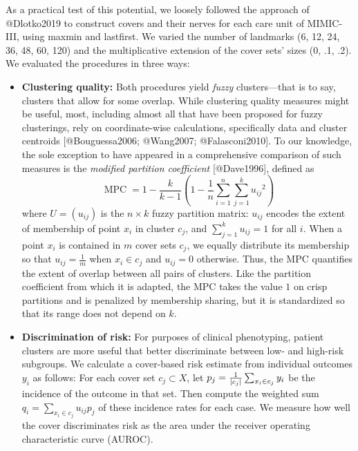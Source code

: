 \documentclass[
]{article}
\providecommand{\tightlist}{%
  \setlength{\itemsep}{0pt}\setlength{\parskip}{0pt}}
\begin{document}
As a practical test of this potential, we loosely followed the approach
of @Dlotko2019 to construct covers and their nerves for each care unit
of MIMIC-III, using maxmin and lastfirst. We varied the number of
landmarks (6, 12, 24, 36, 48, 60, 120) and the multiplicative extension
of the cover sets' sizes (0, .1, .2). We evaluated the procedures in
three ways:

\begin{itemize}
\tightlist
\item
  \textbf{Clustering quality:} Both procedures yield \emph{fuzzy}
  clusters---that is to say, clusters that allow for some overlap. While
  clustering quality measures might be useful, most, including almost
  all that have been proposed for fuzzy clusterings, rely on
  coordinate-wise calculations, specifically data and cluster centroids
  {[}@Bouguessa2006; @Wang2007; @Falasconi2010{]}. To our knowledge, the
  sole exception to have appeared in a comprehensive comparison of such
  measures is the \emph{modified partition coefficient} {[}@Dave1996{]},
  defined as
  \[\operatorname{MPC}=1-\frac{k}{k-1}(1-\frac{1}{n}\sum_{i=1}^{n}{\sum_{j=1}^{k}{{u_{ij}}^2}})\]
  where \(U=(u_{ij})\) is the \(n\times k\) fuzzy partition matrix:
  \(u_{ij}\) encodes the extent of membership of point \(x_i\) in
  cluster \(c_j\), and \(\sum_{j=1}^{k}{u_{ij}}=1\) for all \(i\). When
  a point \(x_i\) is contained in \(m\) cover sets \(c_j\), we equally
  distribute its membership so that \(u_{ij}=\frac{1}{m}\) when
  \(x_i\in c_j\) and \(u_{ij}=0\) otherwise. Thus, the MPC quantifies
  the extent of overlap between all pairs of clusters. Like the
  partition coefficient from which it is adapted, the MPC takes the
  value \(1\) on crisp partitions and is penalized by membership
  sharing, but it is standardized so that its range does not depend on
  \(k\).
\item
  \textbf{Discrimination of risk:} For purposes of clinical phenotyping,
  patient clusters are more useful that better discriminate between low-
  and high-risk subgroups. We calculate a cover-based risk estimate from
  individual outcomes \(y_i\) as follows: For each cover set
  \(c_j\subset X\), let
  \(p_j=\frac{1}{\lvert c_j\rvert}\sum_{x_i\in c_j}{y_i}\) be the incidence of
  the outcome in that set. Then compute the weighted sum
  \(q_i=\sum_{x_i\in c_j}{u_{ij}p_j}\) of these incidence rates for each
  case. We measure how well the cover discriminates risk as the area
  under the receiver operating characteristic curve (AUROC).
\end{itemize}
\end{document}
